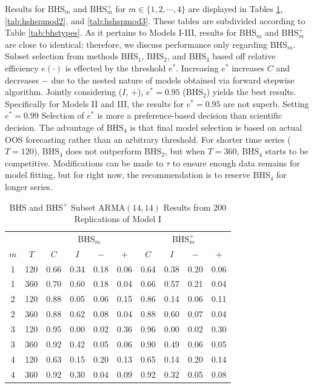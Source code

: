 Results for $\textrm{BHS}_m$ and $\textrm{BHS}^+_m$ for $m \in \{1,2,\cdots,4\}$ are displayed in Tables \ref{tab:hshspmod1}, \ref{tab:hshspmod2}, and \ref{tab:hshspmod3}. These tables are subdivided according to Table \ref{tab:bhstypes}. As it pertains to Models I-III, results for $\textrm{BHS}_m$ and $\textrm{BHS}^+_m$ are close to identical; therefore, we discuss performance only regarding $\textrm{BHS}_m$. Subset selection from methods $\textrm{BHS}_1$, $\textrm{BHS}_2$, and $\textrm{BHS}_3$ based off relative efficiency $e(\cdot)$ is effected by the threshold $e^*$. Increasing $e^*$ increases $C$ and decreases $-$ due to the nested nature of models obtained via forward stepwise algorithm. Jointly considering ($I$, $+$), $e^*=0.95$ ($\textrm{BHS}_2$) yields the best results. Specifically for Models II and III, the results for $e^*=0.95$ are not superb. Setting $e^*=0.99$ Selection of $e^*$ is more a preference-based decision than scientific decision. The advantage of $\textrm{BHS}_4$ is that final model selection is based on actual OOS forecasting rather than an arbitrary threshold. For shorter time series ($T=120$), $\textrm{BHS}_4$ does not outperform $\textrm{BHS}_2$, but when $T=360$, $\textrm{BHS}_4$ starts to be competitive. Modifications can be made to $\tau$ to ensure enough data remains for model fitting, but for right now, the recommendation is to reserve $\textrm{BHS}_4$ for longer series.


\begin{table}[htbp]
\footnotesize
\centering
\caption{BHS and $\textrm{BHS}^+$ Subset ARMA$(14,14)$ Results from 200 Replications of Model I}
\begin{tabular}{cc|cccc|cccc}
  \hline
  & & \multicolumn{4}{c|}{$\textrm{BHS}_m$} & \multicolumn{4}{c}{$\textrm{BHS}^+_m$} \\
  \cline{4-5}  \cline{8-9}
  $m$ & $T$ & $C$ & $I$ & $-$ & $+$ & $C$ & $I$ & $-$ & $+$ \\
  \hline
  1 & 120 & 0.66 & 0.34 & 0.18 & 0.06 & 0.64 & 0.38 & 0.20 & 0.06 \\ 
  1 & 360 & 0.70 & 0.60 & 0.18 & 0.04 & 0.66 & 0.57 & 0.21 & 0.04 \\ 
  2 & 120 & 0.88 & 0.05 & 0.06 & 0.15 & 0.86 & 0.14 & 0.06 & 0.11 \\ 
  2 & 360 & 0.88 & 0.62 & 0.08 & 0.04 & 0.88 & 0.60 & 0.07 & 0.04 \\ 
  3 & 120 & 0.95 & 0.00 & 0.02 & 0.36 & 0.96 & 0.00 & 0.02 & 0.30 \\ 
  3 & 360 & 0.92 & 0.42 & 0.05 & 0.06 & 0.90 & 0.49 & 0.06 & 0.05 \\ 
  \hline
  4 & 120 & 0.63 & 0.15 & 0.20 & 0.13 & 0.65 & 0.14 & 0.20 & 0.14 \\ 
  4 & 360 & 0.92 & 0.30 & 0.04 & 0.09 & 0.92 & 0.32 & 0.05 & 0.08 \\ 
   \hline
\end{tabular}
\label{tab:hshspmod1}
\end{table}



